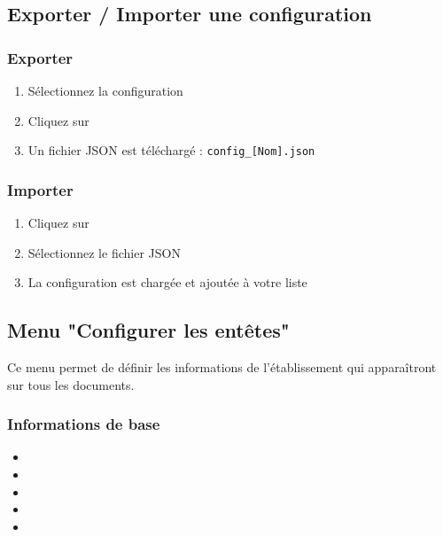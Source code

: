 \subsection{Exporter / Importer une configuration}

\subsubsection{Exporter}

\begin{enumerate}[leftmargin=*]
    \item Sélectionnez la configuration
    \item Cliquez sur 
    \item Un fichier JSON est téléchargé : \texttt{config\_[Nom].json}
\end{enumerate}

\subsubsection{Importer}

\begin{enumerate}[leftmargin=*]
    \item Cliquez sur 
    \item Sélectionnez le fichier JSON
    \item La configuration est chargée et ajoutée à votre liste
\end{enumerate}


\subsection{Menu "Configurer les entêtes"}

Ce menu permet de définir les informations de l'établissement qui apparaîtront sur tous les documents.

\subsubsection{Informations de base}

\begin{itemize}[leftmargin=*]
    \item {}
    \item {}
    \item {}
    \item {}
    \item {}
\end{itemize}

